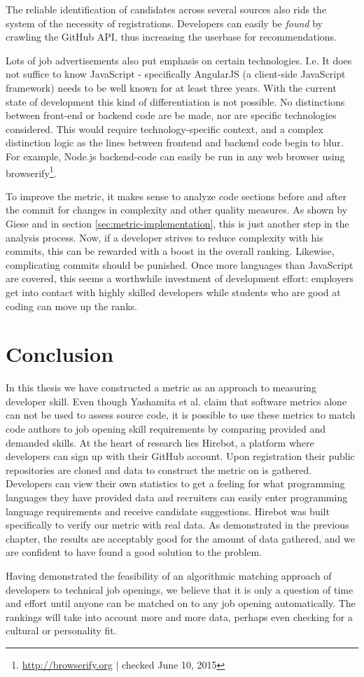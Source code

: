 The reliable identification of candidates across several sources also rids the system of the necessity of registrations. Developers can easily be \textit{found} by crawling the GitHub API, thus increasing the userbase for recommendations.


Lots of job advertisements also put emphasis on certain technologies. I.e. It does not suffice to know JavaScript - specifically AngularJS (a client-side JavaScript framework) needs to be well known for at least three years. With the current state of development this kind of differentiation is not possible. No distinctions between front-end or backend code are be made, nor are specific technologies considered. This would require technology-specific context, and a complex distinction logic as the lines between frontend and backend code begin to blur. For example, Node.js backend-code can easily be run in any web browser using browserify\footnote{\url{http://browserify.org} | checked June 10, 2015}.
\newline

To improve the metric, it makes sense to analyze code sections before and after the commit for changes in complexity and other quality measures. As shown by Giese \cite{pg:2014} and in section \ref{sec:metric-implementation}, this is just another step in the analysis process. Now, if a developer strives to reduce complexity with his commits, this can be rewarded with a boost in the overall ranking. Likewise, complicating commits should be punished. Once more languages than JavaScript are covered, this seems a worthwhile investment of development effort: employers get into contact with highly skilled developers while students who are good at coding can move up the ranks.

\section{Conclusion}
In this thesis we have constructed a metric as an approach to measuring developer skill. Even though Yashamita et al. claim that software metrics alone can not be used to assess source code\cite{mlya:2012}, it is possible to use these metrics to match code authors to job opening skill requirements by comparing provided and demanded skills. At the heart of research lies Hirebot, a platform where developers can sign up with their GitHub account. Upon registration their public repositories are cloned and data to construct the metric on is gathered. Developers can view their own statistics to get a feeling for what programming languages they have provided data and recruiters can easily enter programming language requirements and receive candidate suggestions. Hirebot was built specifically to verify our metric with real data. As demonstrated in the previous chapter, the results are acceptably good for the amount of data gathered, and we are confident to have found a good solution to the problem.

Having demonstrated the feasibility of an algorithmic matching approach of developers to technical job openings, we believe that it is only a question of time and effort until anyone can be matched on to any job opening automatically. The rankings will take into account more and more data, perhaps even checking for a cultural or personality fit.